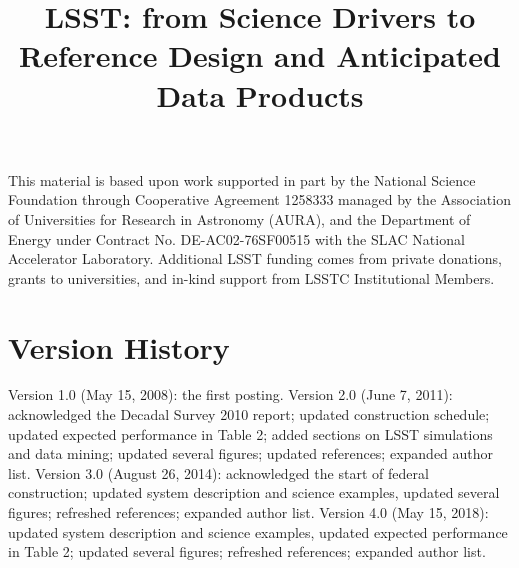 \documentclass[twocolumn]{aastex62}
\begin{document}
\title{LSST: from Science Drivers to Reference Design and Anticipated Data Products}













\acknowledgments
This material is based upon work supported in part by the National Science Foundation 
through Cooperative Agreement 1258333 managed by the Association of Universities for 
Research in Astronomy (AURA), and the Department of Energy under Contract No. 
DE-AC02-76SF00515 with the SLAC National Accelerator Laboratory. Additional LSST 
funding comes from private donations, grants to universities, and in-kind support from 
LSSTC Institutional Members.


\appendix

\section{Version History}

\vskip 0.06in
Version 1.0 (May 15, 2008): the first posting.
\vskip 0.06in
Version 2.0 (June 7, 2011): acknowledged the Decadal Survey 2010 report; updated construction schedule;
updated expected performance in Table 2; added sections on LSST simulations and data mining;
updated several figures; updated references; expanded author list.
\vskip 0.06in
Version 3.0 (August 26, 2014): acknowledged the start of federal construction;
updated system description and science examples, updated several figures; refreshed references;
expanded author list.
\vskip 0.06in
Version 4.0 (May 15, 2018): updated system description and science examples, updated expected
performance in Table 2; updated several figures; refreshed references; expanded author list.


\end{document}
